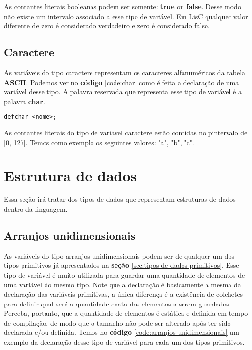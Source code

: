 \documentclass[
  12pt,				%
  oneside,			%
  a4paper,			%
  english,			%
  french,				%
  spanish,			%
  brazil,				%
]{abntex2}
\begin{document}
As contantes literais booleanas podem ser somente: \textbf{true} ou
\textbf{false}. Desse modo não existe um intervalo associado a esse
tipo de variável. Em LisC qualquer valor diferente de zero é
considerado verdadeiro e zero é considerado
falso.

\subsection{Caractere}
\label{subsec:caractere}

As variáveis do tipo caractere representam os caracteres
alfanuméricos da tabela \textbf{ASCII}. Podemos ver no \textbf{código}
\ref{code:char} como é feita a declaração de uma variável desse
tipo. A palavra reservada que representa esse tipo de variável é a palavra \textbf{char}.

\begin{lstlisting}[label=code:char,caption=Declaração de uma variável caractere]
  defchar <nome>;
\end{lstlisting}

As contantes literais do tipo de variável caractere estão contidas no
pintervalo de [0, 127]. Temos como exemplo os seguintes valores: "a",
"b", "c".

\section{Estrutura de dados}
\label{sec:estrutura-de-dados}

Essa seção irá tratar dos tipos de dados que representam estruturas de
dados dentro da linguagem.

\subsection{Arranjos unidimensionais}
\label{subsec:arranjos-unidimensionais}

As variáveis do tipo arranjos unidimensionais podem ser de qualquer um
dos tipos primitivos já apresentados na \textbf{seção}
\ref{sec:tipos-de-dados-primitivos}. Esse tipo de variável é muito
utilizada para guardar uma quantidade de elementos de uma variável do mesmo
tipo. Note que a declaração é basicamente a mesma da declaração das
variáveis primitivas, a única diferença é a existência de colchetes
para definir qual será a quantidade exata dos elementos a serem
guardados. Perceba, portanto, que a quantidade de elementos é estática
e definida em tempo de compilação, de modo que o tamanho não pode ser
alterado após ter sido declarada e/ou definida. Temos no
\textbf{código} \ref{code:arranjos-unidimensionais} um exemplo da
declaração desse tipo de variável para cada um dos tipos primitivos.
\end{document}
